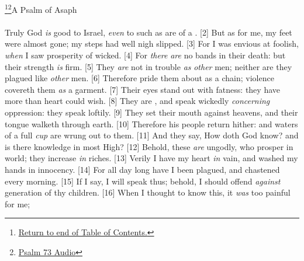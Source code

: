 \footnote{\textcolor[cmyk]{0.99998,1,0,0}{\hyperlink{TOC}{Return to end of Table of Contents.}}}\footnote{\href{https://audiobible.com/bible/psalms_73.html}{\textcolor[cmyk]{0.99998,1,0,0}{Psalm 73 Audio}}}\textcolor[cmyk]{0.99998,1,0,0}{A Psalm of Asaph}\\
\\
\textcolor[cmyk]{0.99998,1,0,0}{Truly God \emph{is} good to Israel, \emph{even} to such as are of a .}
[2] \textcolor[cmyk]{0.99998,1,0,0}{But as for me, my feet were almost gone; my steps had well nigh slipped.}
[3] \textcolor[cmyk]{0.99998,1,0,0}{For I was envious at  foolish, \emph{when} I saw  prosperity of  wicked.}
[4] \textcolor[cmyk]{0.99998,1,0,0}{For \emph{there} \emph{are} no bands in their death: but their strength \emph{is} firm.}
[5] \textcolor[cmyk]{0.99998,1,0,0}{They \emph{are} not in trouble \emph{as} \emph{other} men; neither are they plagued like \emph{other} men.}
[6] \textcolor[cmyk]{0.99998,1,0,0}{Therefore pride  them about as a chain; violence covereth them \emph{as} a garment.}
[7] \textcolor[cmyk]{0.99998,1,0,0}{Their eyes stand out with fatness: they have more than heart could wish.}
[8] \textcolor[cmyk]{0.99998,1,0,0}{They are , and speak wickedly \emph{concerning} oppression: they speak loftily.}
[9] \textcolor[cmyk]{0.99998,1,0,0}{They set their mouth against  heavens, and their tongue walketh through  earth.}
[10] \textcolor[cmyk]{0.99998,1,0,0}{Therefore his people return hither: and waters of a full \emph{cup} are wrung out to them.}
[11] \textcolor[cmyk]{0.99998,1,0,0}{And they say, How doth God know? and is there knowledge in  most High?}
[12] \textcolor[cmyk]{0.99998,1,0,0}{Behold, these \emph{are}  ungodly, who prosper in  world; they increase \emph{in} riches.}
[13] \textcolor[cmyk]{0.99998,1,0,0}{Verily I have  my heart \emph{in} vain, and washed my hands in innocency.}
[14] \textcolor[cmyk]{0.99998,1,0,0}{For all  day long have I been plagued, and chastened every morning.}
[15] \textcolor[cmyk]{0.99998,1,0,0}{If I say, I will speak thus; behold, I should offend \emph{against}  generation of thy children.}
[16] \textcolor[cmyk]{0.99998,1,0,0}{When I thought to know this, it \emph{was} too painful for me;}
